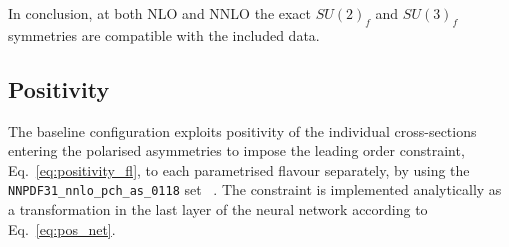 In conclusion, at both NLO and NNLO the exact $SU(2)_f$ and $SU(3)_f$ symmetries are compatible with the included data.

\subsection*{Positivity}

The baseline configuration exploits positivity of the individual cross-sections entering the polarised asymmetries to impose the leading order constraint, Eq.~\eqref{eq:positivity_fl}, to each parametrised flavour separately, by using the \texttt{NNPDF31\_nnlo\_pch\_as\_0118} set ~\cite{NNPDF:2017mvq}. The constraint is implemented analytically as a transformation in the last layer of the neural network according to Eq.~\eqref{eq:pos_net}.%

